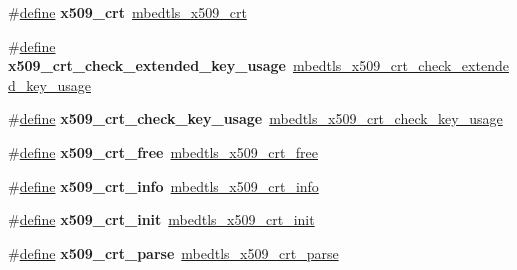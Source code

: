 \begin{DoxyCompactItemize}
\item 
\mbox{\label{compat-1_83_8h_a03f1397c5e27004ad4c41061aa2b2a2d}} 
\#\hyperlink{structdefine}{define} {\bfseries x509\+\_\+crt}~\hyperlink{structmbedtls__x509__crt}{mbedtls\+\_\+x509\+\_\+crt}
\item 
\mbox{\label{compat-1_83_8h_ab46192d64fe7264676c5872c0a082f9f}} 
\#\hyperlink{structdefine}{define} {\bfseries x509\+\_\+crt\+\_\+check\+\_\+extended\+\_\+key\+\_\+usage}~\hyperlink{group__x509__module_gad21c0e75a3fdbeb1f65e4d339e479df3}{mbedtls\+\_\+x509\+\_\+crt\+\_\+check\+\_\+extended\+\_\+key\+\_\+usage}
\item 
\mbox{\label{compat-1_83_8h_adcad083904d61e5a349560bd67acb4c5}} 
\#\hyperlink{structdefine}{define} {\bfseries x509\+\_\+crt\+\_\+check\+\_\+key\+\_\+usage}~\hyperlink{group__x509__module_ga0ab7857ffd82467207e718bb9f0131a2}{mbedtls\+\_\+x509\+\_\+crt\+\_\+check\+\_\+key\+\_\+usage}
\item 
\mbox{\label{compat-1_83_8h_a105dd3b34ab4bac55f8ad24385cad121}} 
\#\hyperlink{structdefine}{define} {\bfseries x509\+\_\+crt\+\_\+free}~\hyperlink{group__x509__module_gab33c1e4e20bea7ce536119f54a113c6b}{mbedtls\+\_\+x509\+\_\+crt\+\_\+free}
\item 
\mbox{\label{compat-1_83_8h_acce086f787906b4990bd40e87e2c40e1}} 
\#\hyperlink{structdefine}{define} {\bfseries x509\+\_\+crt\+\_\+info}~\hyperlink{group__x509__module_gabaf30f2269fc3b6608b25871f9d09da6}{mbedtls\+\_\+x509\+\_\+crt\+\_\+info}
\item 
\mbox{\label{compat-1_83_8h_adfbe0232737b9aec0594c11294f29f4f}} 
\#\hyperlink{structdefine}{define} {\bfseries x509\+\_\+crt\+\_\+init}~\hyperlink{group__x509__module_ga016dd06bc770e77b84005f305df20ed1}{mbedtls\+\_\+x509\+\_\+crt\+\_\+init}
\item 
\mbox{\label{compat-1_83_8h_a58c55fb5ac1c5b28e0dff45d984875d3}} 
\#\hyperlink{structdefine}{define} {\bfseries x509\+\_\+crt\+\_\+parse}~\hyperlink{group__x509__module_ga033567483649030f7f859db4f4cb7e14}{mbedtls\+\_\+x509\+\_\+crt\+\_\+parse}
\item 
\mbox{\label{compat-1_83_8h_a5b006f1a5a47d96d99decf0d351be8c0}} 

\end{DoxyCompactItemize}
